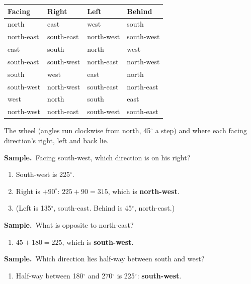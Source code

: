 \documentclass[11pt,a4paper]{article}
\newif\ifkeepsamp
\newcommand{\samp}{\ifkeepsamp\needspace{4\baselineskip}\fi\textbf{\color{ember}Sample.}\ }
\begin{document}
\begin{center}
\begin{minipage}[c]{0.40\linewidth}\centering
{}
\end{minipage}\hfill
\begin{minipage}[c]{0.56\linewidth}\centering
\small\renewcommand{\arraystretch}{1.18}\setlength{\tabcolsep}{6pt}
\begin{tabular}{@{}llll@{}}
\toprule
\textbf{\color{slate}Facing} & \textbf{\color{slate}Right} & \textbf{\color{slate}Left} & \textbf{\color{slate}Behind} \\ \midrule
north & east & west & south \\
north-east & south-east & north-west & south-west \\
east & south & north & west \\
south-east & south-west & north-east & north-west \\
south & west & east & north \\
south-west & north-west & south-east & north-east \\
west & north & south & east \\
north-west & north-east & south-west & south-east \\
\bottomrule
\end{tabular}
\end{minipage}
\par\medskip
{\small The wheel (angles run clockwise from north, 45$^\circ$ a step) and where each facing direction's right, left and back lie.}
\end{center}

\samp Facing south-west, which direction is on his right?
\begin{enumerate}
\item South-west is 225$^\circ$.
\item Right is $+90^\circ$: $225 + 90 = 315$, which is \textbf{north-west}.
\item (Left is 135$^\circ$, south-east. Behind is 45$^\circ$, north-east.)
\end{enumerate}
\samp What is opposite to north-east?
\begin{enumerate}
\item $45 + 180 = 225$, which is \textbf{south-west}.
\end{enumerate}
\samp Which direction lies half-way between south and west?
\begin{enumerate}
\item Half-way between 180$^\circ$ and 270$^\circ$ is 225$^\circ$: \textbf{south-west}.
\end{enumerate}
\end{document}

